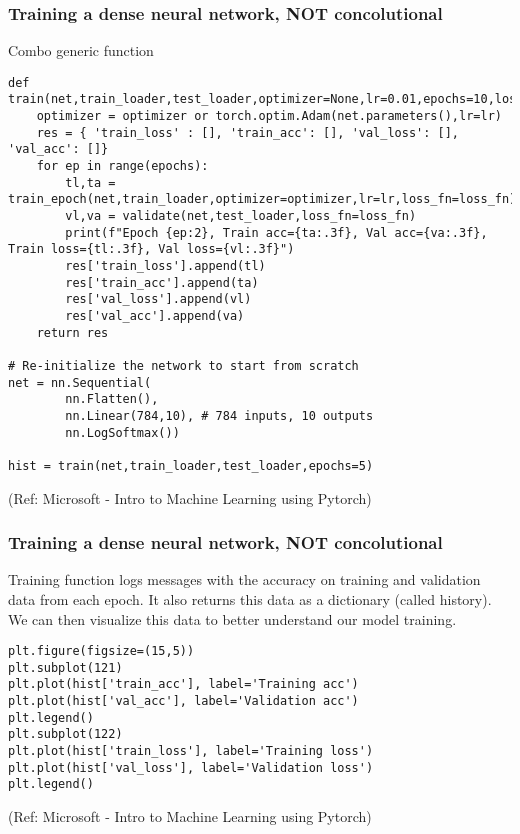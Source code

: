 \begin{frame}[fragile] \frametitle{Training a dense neural network, NOT concolutional}

Combo generic function

\begin{lstlisting}
def train(net,train_loader,test_loader,optimizer=None,lr=0.01,epochs=10,loss_fn=nn.NLLLoss()):
    optimizer = optimizer or torch.optim.Adam(net.parameters(),lr=lr)
    res = { 'train_loss' : [], 'train_acc': [], 'val_loss': [], 'val_acc': []}
    for ep in range(epochs):
        tl,ta = train_epoch(net,train_loader,optimizer=optimizer,lr=lr,loss_fn=loss_fn)
        vl,va = validate(net,test_loader,loss_fn=loss_fn)
        print(f"Epoch {ep:2}, Train acc={ta:.3f}, Val acc={va:.3f}, Train loss={tl:.3f}, Val loss={vl:.3f}")
        res['train_loss'].append(tl)
        res['train_acc'].append(ta)
        res['val_loss'].append(vl)
        res['val_acc'].append(va)
    return res

# Re-initialize the network to start from scratch
net = nn.Sequential(
        nn.Flatten(), 
        nn.Linear(784,10), # 784 inputs, 10 outputs
        nn.LogSoftmax())

hist = train(net,train_loader,test_loader,epochs=5)		
\end{lstlisting}


\tiny{(Ref: Microsoft - Intro to Machine Learning using Pytorch)}
\end{frame}

\begin{frame}[fragile] \frametitle{Training a dense neural network, NOT concolutional}

Training function logs messages with the accuracy on training and validation data from each epoch. It also returns this data as a dictionary (called history). We can then visualize this data to better understand our model training.

\begin{lstlisting}
plt.figure(figsize=(15,5))
plt.subplot(121)
plt.plot(hist['train_acc'], label='Training acc')
plt.plot(hist['val_acc'], label='Validation acc')
plt.legend()
plt.subplot(122)
plt.plot(hist['train_loss'], label='Training loss')
plt.plot(hist['val_loss'], label='Validation loss')
plt.legend()
\end{lstlisting}


\tiny{(Ref: Microsoft - Intro to Machine Learning using Pytorch)}
\end{frame}


